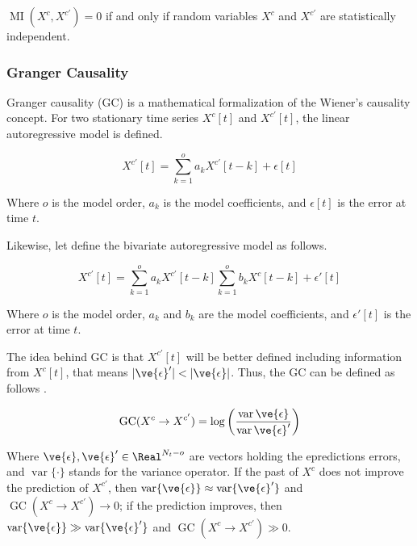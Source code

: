 $\operatorname{MI}(X^{c}, X^{c'})=0$ if and only if random variables $X^{c}$ and $X^{c'}$ are statistically independent.

\subsubsection{Granger Causality}

Granger causality (GC) is a mathematical formalization of the Wiener's causality concept. For two stationary time series $X^{c}[t]$ and $X^{c'}[t]$, the linear autoregressive model is defined.

\begin{equation}
    X^{c'}[t] = \sum_{k=1}^{o} a_k X^{c'}[t-k] + \epsilon[t]
\end{equation}

Where $o$ is the model order, $a_k$ is the model coefficients, and $\epsilon[t]$ is the error at time $t$. 

Likewise, let define the bivariate autoregressive model as follows.

\begin{equation}
     X^{c'}[t] = \sum_{k=1}^{o} a_k X^{c'}[t-k] \sum_{k=1}^{o} b_k X^{c}[t-k] + \epsilon'[t]
\end{equation}

Where $o$ is the model order, $a_k$ and $b_k$ are the model coefficients, and $\epsilon'[t]$ is the error at time $t$. 

The idea behind GC is that $X^{c'}[t]$ will be better defined including information from $X^{c}[t]$, that means $|\ve{\epsilon}'|<|\ve{\epsilon}|$. Thus, the GC can be defined as follows \cite{rezaei2023classification}.

\begin{equation} 
\operatorname{GC}(X^{c} \rightarrow X^{c'}) = \log \left( \frac{\operatorname{var}{\ve{\epsilon}}}{\operatorname{var}{\ve{\epsilon}'}} \right) 
\end{equation}

Where $\ve{\epsilon}, \ve{\epsilon}' \in \Real^{N_t-o}$ are vectors holding the epredictions errors, and $\operatorname{var}\{\cdot\}$ stands for the variance operator. If the past of $X^{c}$ does not improve the prediction of $X^{c'}$, then $\operatorname{var}\{\ve{\epsilon}\} \approx \operatorname{var}\{\ve{\epsilon}'\}$ and $\operatorname{GC}(X^{c} \rightarrow X^{c'}) \rightarrow 0 $; if the prediction improves, then $\operatorname{var}\{\ve{\epsilon}\} \gg \operatorname{var}\{\ve{\epsilon}'\}$ and $\operatorname{GC}(X^{c} \rightarrow X^{c'}) \gg 0 $.



